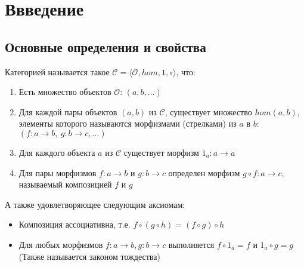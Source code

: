 \section{Ввведение}
\subsection{Основные определения и свойства}
\begin{defn}
  Категорией называется такое
  $\mathcal{C} = \langle \mathcal{O}, hom, 1, \circ \rangle$, что:
  \begin{enumerate}
  \item Есть множество объектов $\mathcal{O}$: $(a, b, \ldots)$
  \item Для каждой пары объектов $(a, b)$ из $\mathcal{C}$, существует множество
    $hom(a, b)$, элементы которого называются морфизмами (стрелками) из $a$ в $b$:
    $(f \colon a \to b,\ g \colon b \to c, \ldots)$
  \item Для каждого объекта $a$ из $\mathcal{C}$ существует морфизм
    $1_a \colon a \to a$
  \item Для пары морфизмов $f \colon a \to b$ и $g \colon b \to c$
    определен морфизм $g \circ f \colon a \to c$, называемый композицией $f$ и $g$
  \end{enumerate}
  А также удовлетворяющее следующим аксиомам:
  \begin{itemize}
  \item Композиция ассоциативна, т.е. $f \circ (g \circ h) = (f \circ g) \circ h$
  \item Для любых морфизмов $f \colon a \to b, g \colon b \to c$ выполняется
    $f \circ 1_a = f$ и $1_a \circ g = g$ (Также называется законом тождества)
  \end{itemize}
\end{defn}

